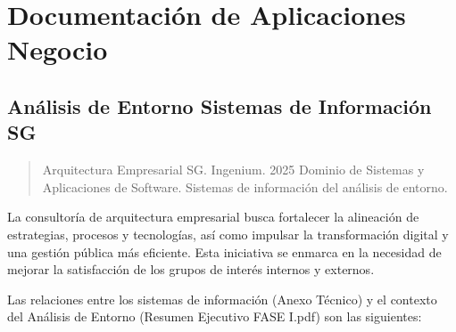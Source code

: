 \documentclass[
	a4paper, %
	12pt, %
]{include/CSSullivanBusinessReport}
\begin{document}
\newpage

\begin{twothirdswidth} %
	\tableofcontents %
\end{twothirdswidth}

\newpage


\newpage

\section{Documentación de Aplicaciones
Negocio}\label{sec:documentaciuxf3n-de-aplicaciones-negocio}

\subsection{Análisis de Entorno Sistemas de Información
SG}\label{sec:anuxe1lisis-de-entorno-sistemas-de-informaciuxf3n-sg}

\begin{quote}
Arquitectura Empresarial SG. Ingenium. 2025 Dominio de Sistemas y
Aplicaciones de Software. Sistemas de información del análisis de
entorno.
\end{quote}

La consultoría de arquitectura empresarial busca fortalecer la
alineación de estrategias, procesos y tecnologías, así como impulsar la
transformación digital y una gestión pública más eficiente. Esta
iniciativa se enmarca en la necesidad de mejorar la satisfacción de los
grupos de interés internos y externos.

Las relaciones entre los sistemas de información (Anexo Técnico) y el
contexto del Análisis de Entorno (Resumen Ejecutivo FASE I.pdf) son las
siguientes:
\end{document}
